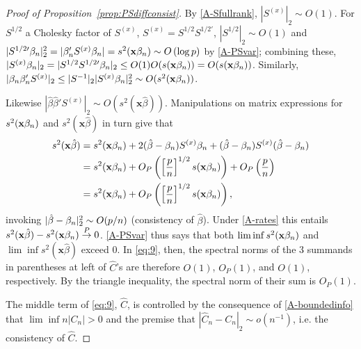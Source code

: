 \documentclass{article}
\theoremstyle{remark}
\begin{document}
\begin{proof}[Proof of Proposition~\ref{prop:PSdiffconsist}]
By \ref{A-Sfullrank}, $|S^{(x)}|_{2} \sim O(1)$.  For $S^{1/2}$ a Cholesky factor of $S^{(x)}$, $S^{(x)} = S^{1/2}S^{1/2\prime}$, $|S^{1/2}|_{2} \sim O(1)$ and $|S^{{1/2}\prime}\beta_{n } |_{2}^{2} = |\beta_{n }'S^{(x)}\beta_{n }| = s^{2}(\mathbf{x}\beta_{n }) \sim O\left( \log p\right)
$ by \ref{A-PSvar}; combining these, $|S^{(x)}\betatrue|_{2} = |S^{1/2}S^{{1/2}\prime}\betatrue|_{2} \leq O(1) O(s(\mathbf{x}\betatrue)) = O(s(\mathbf{x}\betatrue))  %
$.  Similarly, $|\beta_{n }\beta_{n }'S^{(x)}|_{2}  \leq |S^{-1}|_{2} |S^{(x)}\beta_{n }|_{2}^{2} \sim O(s^{2}(\mathbf{x}\beta_{n }))$. 

Likewise $|\hat{\beta}\hat{\beta}'S^{(x)}|_{2} \sim O(s^{2}(\mathbf{x}\hat\beta))$.  Manipulations on matrix expressions for $s^2(\mathbf{x}\beta_{n })$ and $s^2(\mathbf{x}\hat\beta)$ in turn give that 
\begin{align}
  s^{2}(\mathbf{x}\hat\beta) &= s^{2}(\mathbf{x}\beta_{n }) + 2(\hat\beta - \beta_{n })S^{(x)}\beta_{n } + (\hat\beta - \beta_{n })S^{(x)}(\hat\beta -\beta_{n }) \nonumber \\
  &= s^{2}(\mathbf{x}\beta_{n }) + O_{P}\left(\left[\frac{p }{n}\right]^{1/2}s(\mathbf{x}\beta_{n })\right) + O_{P}\left(  \frac{p}{n} \right) \nonumber \\
& = s^{2}(\mathbf{x}\beta_{n }) + O_{P}\left(\left[\frac{p}{n}\right]^{1/2}s(\mathbf{x}\beta_{n })\right)  ,\label{eq:11}
\end{align}
invoking  $|\hat\beta - \beta_{n }|_{2}^{2} \sim O(p/n)$ (consistency of $\hat\beta$).
Under \ref{A-rates} this entails $ s^{2}(\mathbf{x}\hat\beta) -  s^{2}(\mathbf{x}\beta_{n }) \stackrel{P}{\rightarrow} 0$.  \ref{A-PSvar} thus says that both  $\lim\inf s^{2}(\mathbf{x}\beta_{n })$ and $\lim\inf s^{2}(\mathbf{x}\hat\beta)$ exceed 0. 
In \eqref{eq:9}, then, the spectral norms of the 3 summands in parentheses at left of $\hat{C}$'s are therefore $O(1)$, $O_{P}(1)$, and $O(1)$, respectively. By the triangle inequality, the spectral norm of their sum is $O_{P}(1)$.

The middle term of \eqref{eq:9}, $\hat C$, is controlled by the consequence of \ref{A-boundedinfo} that $\lim\inf n|C_{n}|>0$ and the premise that $|\hat{C}_{n} - C_{n}|_{2} \sim o(n^{-1})$, i.e. the consistency of $\hat{C}$.  


\end{proof}
\end{document}
